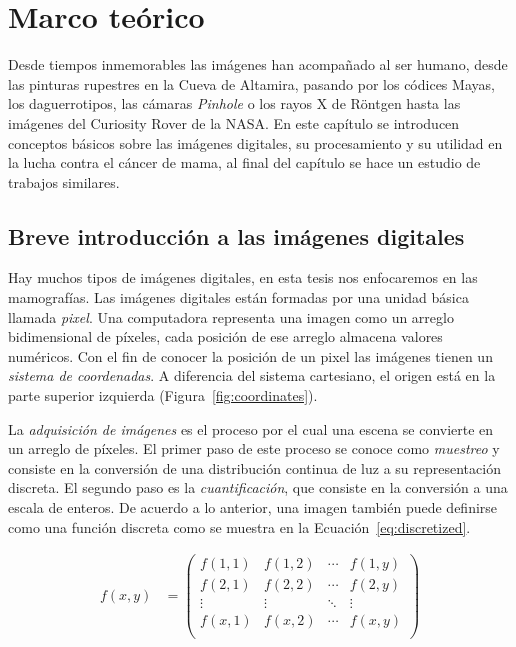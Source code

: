\chapter{Marco teórico}
\label{marco}

Desde tiempos inmemorables las imágenes han acompañado al ser humano, desde las
pinturas rupestres en la Cueva de Altamira, pasando por los códices Mayas, los
daguerrotipos, las cámaras \textit{Pinhole} o los rayos X de Röntgen hasta las
imágenes del Curiosity Rover de la NASA. En este capítulo se introducen
conceptos básicos sobre las imágenes digitales, su procesamiento y su utilidad
en la lucha contra el cáncer de mama, al final del capítulo se hace un estudio
de trabajos similares.

\section{Breve introducción a las imágenes digitales}


Hay muchos tipos de imágenes digitales, en esta tesis nos enfocaremos en las
mamografías. Las imágenes digitales están formadas por una unidad básica
llamada \textit{pixel}. Una computadora representa una imagen como un arreglo
bidimensional de píxeles, cada posición de ese arreglo almacena valores
numéricos. Con el fin de conocer la posición de un pixel las imágenes tienen un
\textit{sistema de coordenadas}. A diferencia del sistema cartesiano, el origen
está en la parte superior izquierda (Figura~\ref{fig:coordinates}). 

\shorthandoff{>} %
    
\shorthandon{>} 

La \textit{adquisición de imágenes} es el proceso por el cual una escena se
convierte en un arreglo de píxeles. El primer paso de este proceso se conoce
como \textit{muestreo} y consiste en la conversión de una distribución continua
de luz a su representación discreta. El segundo paso es la
\textit{cuantificación}, que consiste en la conversión a una escala de enteros.
De acuerdo a lo anterior, una imagen también puede definirse como una función
discreta como se muestra en la Ecuación~\ref{eq:discretized}. 

\begin{equation}
\label{eq:discretized}
    \begin{split}
            f(x,y) & = 
            \begin{pmatrix}
                f(1,1) & f(1,2) & \cdots & f(1,y) \\
                f(2,1) & f(2,2) & \cdots & f(2,y) \\
                \vdots & \vdots & \ddots & \vdots \\
                f(x,1) & f(x,2) & \cdots & f(x,y) \\
            \end{pmatrix}
    \end{split}
\end{equation}

